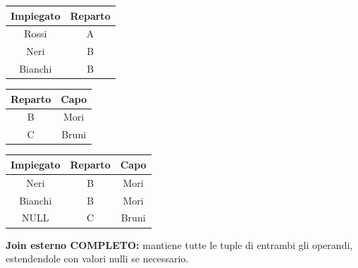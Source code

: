 \documentclass{article}
\begin{document}
\begin{itemize}
{\begin{minipage}{.25\textwidth}
  \centering
    \begin{tabular}{|c|c|}
        \hline
        \textbf{Impiegato} & \textbf{Reparto} \\
        \hline
        Rossi & A \\
        \hline
        Neri &  B \\
        \hline
        Bianchi & B \\
         \hline
        \end{tabular}
\end{minipage}%
\hfill
\begin{minipage}{.25\textwidth}
  \centering
       \begin{tabular}{|c|c|}
        \hline
        \textbf{Reparto} & \textbf{Capo} \\
        \hline
        B & Mori\\
        \hline
        C & Bruni\\
         \hline
        \end{tabular}
\end{minipage}
\hfill
\begin{minipage}{.25\textwidth}
  \centering
       \begin{tabular}{|c|c|c|}
        \hline
        \textbf{Impiegato} & \textbf{Reparto} & \textbf{Capo} \\
        \hline
        Neri & B & Mori\\
         \hline
         Bianchi & B & Mori\\
         \hline
        NULL & C & Bruni\\
         \hline
        \end{tabular}
\hspace{1em}
\end{minipage}


\item \textbf{Join esterno COMPLETO:} mantiene tutte le tuple di entrambi gli operandi, estendendole con valori nulli se necessario.

}
\end{itemize}
\end{document}
